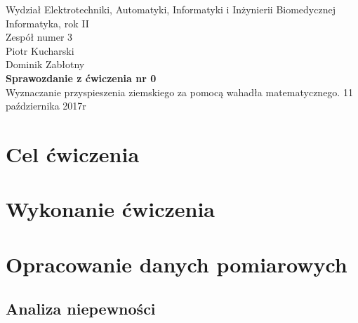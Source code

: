 \documentclass[a4paper,12pts]{article}
\begin{document}
	\thispagestyle{empty}
	\begin{flushleft}
		Wydział Elektrotechniki, Automatyki, Informatyki i Inżynierii Biomedycznej \\
		Informatyka, rok II \\
		Zespół numer 3 \\
		Piotr Kucharski \\
		Dominik Zabłotny \\
		\vspace*{\fill}
		{\large \textbf{Sprawozdanie z ćwiczenia nr 0} } \\
		Wyznaczanie przyspieszenia ziemskiego za pomocą wahadła matematycznego.		
		\vfill	
		11 października 2017r
	\end{flushleft}
	
	\newpage
	
	
	\section{Cel ćwiczenia}
	
	
	\section{Wykonanie ćwiczenia}
	
	
	\section{Opracowanie danych pomiarowych}
	
	
	\subsection{Analiza niepewności}
	
\end{document}
